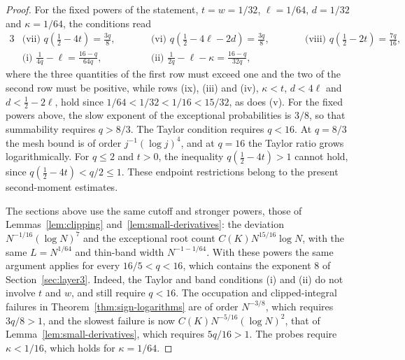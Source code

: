 \begin{proof}
For the fixed powers of the statement, $t=w=1/32$, $\ell=1/64$,
$d=1/32$ and $\kappa=1/64$, the conditions read
\begin{alignat*}{3}
 &\text{(vii) }q\left(\frac12-4t\right)=\frac{3q}8, &\qquad
 &\text{(vi) }q\left(\frac12-4\ell-2d\right)=\frac{3q}8, &\qquad
 &\text{(viii) }q\left(\frac12-2t\right)=\frac{7q}{16},\\
 &\text{(i) }\frac1{4q}-\ell=\frac{16-q}{64q}, &&
 \text{(ii) }\frac1{2q}-\ell-\kappa=\frac{16-q}{32q},
\end{alignat*}
where the three quantities of the first row must exceed one and the two
of the second row must be positive, while rows (ix), (iii) and (iv),
$\kappa<t$, $d<4\ell$ and $d<\frac12-2\ell$, hold since
$1/64<1/32<1/16<15/32$, as does (v).
For the fixed powers above, the slow exponent of the exceptional
probabilities is $3/8$, so that summability requires $q>8/3$. The
Taylor condition requires $q<16$.
At $q=8/3$ the mesh bound is of order $j^{-1}(\log j)^4$, and at $q=16$
the Taylor ratio grows logarithmically.
For $q\le2$ and $t>0$, the inequality $q(\frac12-4t)>1$ cannot hold,
since $q(\frac12-4t)<q/2\le1$.
These endpoint restrictions belong to the present second-moment estimates.

The sections above use the same cutoff and stronger powers, those of
Lemmas~\ref{lem:clipping} and~\ref{lem:small-derivatives}: the
deviation $N^{-1/16}(\log N)^7$ and the exceptional root count
$C(K)N^{15/16}\log N$, with the same $L=N^{1/64}$ and thin-band width
$N^{-1-1/64}$. With these powers the same
argument applies for every $16/5<q<16$, which contains the exponent $8$
of Section~\ref{sec:layer3}. Indeed, the Taylor and band conditions (i)
and (ii) do not involve $t$ and $w$, and still require $q<16$. The
occupation and clipped-integral failures in
Theorem~\ref{thm:sign-logarithms} are of order $N^{-3/8}$, which requires
$3q/8>1$, and the slowest failure is now $C(K)N^{-5/16}(\log N)^2$, that
of Lemma~\ref{lem:small-derivatives}, which requires $5q/16>1$. The
probes require $\kappa<1/16$, which holds for $\kappa=1/64$.
\end{proof}

